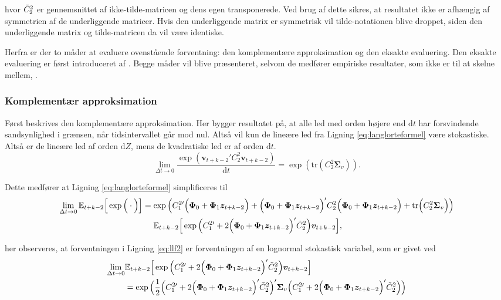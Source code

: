 \documentclass[
  a4paper,
  oneside]{memoir}
\begin{document}
hvor \(\Tilde{C}_2^{2}\) er gennemsnittet af ikke-tilde-matricen og dens egen transponerede. Ved brug af dette sikres, at resultatet ikke er afhængig af symmetrien af de underliggende matricer. Hvis den underliggende matrix er symmetrisk vil tilde-notationen blive droppet, siden den underliggende matrix og tilde-matricen da vil være identiske.

Herfra er der to måder at evaluere ovenstående forventning: den komplementære approksimation og den eksakte evaluering. Den eksakte evaluering er først introduceret af \citep{CampVicCha2003}. Begge måder vil blive præsenteret, selvom de medfører empiriske resultater, som ikke er til at skelne mellem, \citep{JurVic2011}.

\hypertarget{komplementuxe6r-approksimation}{%
\subsubsection{Komplementær approksimation}\label{komplementuxe6r-approksimation}}

Først beskrives den komplementære approksimation. Her bygger resultatet på, at alle led med orden højere end \(\text{d}t\) har forsvindende sandsynlighed i grænsen, når tidsintervallet går mod nul. Altså vil kun de lineære led fra Ligning \eqref{eq:langlorteformel} være stokastiske. Altså er de lineære led af orden \(\text{d}Z\), mens de kvadratiske led er af orden \(\text{d}t\).
\[\lim_{\Delta t \to 0}\frac{\exp\left( \bm{v}_{t+k-2}' C_2^2 \bm{v}_{t+k-2} \right)}{\text{d}t}=\exp\left( \text{tr}\left(C_2^2 \bm{\Sigma}_v\right) \right).\]

Dette medfører at Ligning \eqref{eq:langlorteformel} simplificeres til
\begin{align}
\lim_{\Delta t \to 0}\mathbb{E}_{t+k-2}\Big[\exp\Big(\cdot\Big)\Big] &=\exp\Big( C_1^{2\prime} \Big(\bm{\Phi}_0+\bm{\Phi}_1\bm{z}_{t+k-2} \Big) + \Big(\bm{\Phi}_0+\bm{\Phi}_1\bm{z}_{t+k-2} \Big)' C_2^2 \Big(\bm{\Phi}_0+\bm{\Phi}_1\bm{z}_{t+k-2}\Big) +  \text{tr}\Big(C_2^2 \bm{\Sigma}_v\Big)\Big)\notag\\
                                &\,\,\quad \mathbb{E}_{t+k-2}\Big[ \exp\Big( C_1^{2\prime} + 2\Big(\bm{\Phi}_0+\bm{\Phi}_1\bm{z}_{t+k-2}\Big)' \Tilde{C}_2^{2} \Big)   \bm{v}_{t+k-2}\Big], \label{eq:llf2}
\end{align}

her observeres, at forventningen i Ligning \eqref{eq:llf2} er forventningen af en lognormal stokastisk variabel, som er givet ved
\begin{align}
\lim_{\Delta t \to 0}&\mathbb{E}_{t+k-2}\Big[ \exp\Big( C_1^{2\prime} + 2\Big(\bm{\Phi}_0+\bm{\Phi}_1\bm{z}_{t+k-2}\Big)' \Tilde{C}_2^{2} \Big)   \bm{v}_{t+k-2}\Big]\notag\\
&=\exp\Big(\frac{1}{2} \Big(C_1^{2\prime} + 2\Big(\bm{\Phi}_0+\bm{\Phi}_1\bm{z}_{t+k-2}\Big)' \Tilde{C}_2^{2}\Big)' \bm{\Sigma}_v \Big(C_1^{2\prime} + 2\Big(\bm{\Phi}_0+\bm{\Phi}_1\bm{z}_{t+k-2}\Big)' \Tilde{C}_2^{2}\Big)\Big) \label{eq:llf3}
\end{align}
\end{document}
